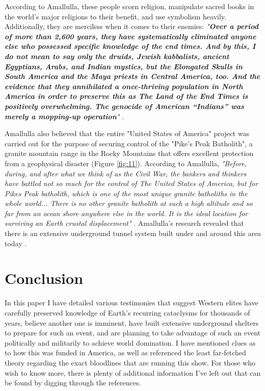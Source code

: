 \documentclass[10pt,twocolumn,letterpaper]{article}
\begin{document}
According to Amallulla, these people scorn religion, manipulate sacred books in the world's major religions to their benefit, and use symbolism heavily. Additionally, they are merciless when it comes to their enemies: \textit{"\textbf{Over a period of more than 2,600 years, they have systematically eliminated anyone else who possessed specific knowledge of the end times. And by this, I do not mean to say only the druids, Jewish kabbalists, ancient Egyptians, Arabs, and Indian mystics, but the Elongated Skulls in South America and the Maya priests in Central America, too. And the evidence that they annihilated a once-thriving population in North America in order to preserve this as The Land of the End Times is positively overwhelming. The genocide of American “Indians” was merely a mopping-up operation}"} \cite{33,34}.

Amallulla also believed that the entire "United States of America" project was carried out for the purpose of securing control of the "Pike's Peak Batholith", a granite mountain range in the Rocky Mountains that offers excellent protection from a geophysical disaster (Figure \ref{fig:11}). According to Amallulla, \textit{"Before, during, and after what we think of as the Civil War, the bankers and thinkers have battled not so much for the control of The United States of America, but for Pikes Peak batholith, which is one of the most unique granite batholiths in the whole world... There is no other granite batholith at such a high altitude and so far from an ocean shore anywhere else in the world. It is the ideal location for surviving an Earth crustal displacement"} \cite{33,34}. Amallulla's research revealed that there is an extensive underground tunnel system built under and around this area today \cite{36}.

\section{Conclusion}

In this paper I have detailed various testimonies that suggest Western elites have carefully preserved knowledge of Earth's recurring cataclysms for thousands of years, believe another one is imminent, have built extensive underground shelters to prepare for such an event, and are planning to take advantage of such an event politically and militarily to achieve world domination. I have mentioned clues as to how this was funded in America, as well as referenced the least far-fetched theory regarding the exact bloodlines that are running this show. For those who wish to know more, there is plenty of additional information I've left out that can be found by digging through the references.
\end{document}
